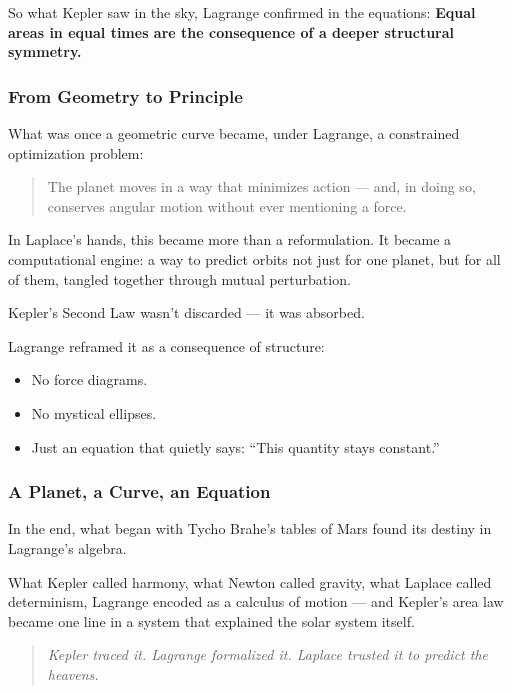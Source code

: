 So what Kepler saw in the sky, Lagrange confirmed in the equations:  
\textbf{Equal areas in equal times are the consequence of a deeper structural symmetry.}

\subsubsection*{From Geometry to Principle}

What was once a geometric curve became, under Lagrange, a constrained optimization problem:
\begin{quote}
    The planet moves in a way that minimizes action —  
    and, in doing so, conserves angular motion without ever mentioning a force.
\end{quote}

In Laplace’s hands, this became more than a reformulation. It became a computational engine:  
a way to predict orbits not just for one planet, but for all of them, tangled together through mutual perturbation.

\begin{tcolorbox}[colback=blue!5!white, colframe=blue!60!black, title={Kepler, Rediscovered}]
Kepler’s Second Law wasn’t discarded — it was absorbed.

Lagrange reframed it as a consequence of structure:  
\begin{itemize}
    \item No force diagrams.
    \item No mystical ellipses.
    \item Just an equation that quietly says: “This quantity stays constant.”
\end{itemize}
\end{tcolorbox}

\subsubsection*{A Planet, a Curve, an Equation}

In the end, what began with Tycho Brahe’s tables of Mars found its destiny in Lagrange’s algebra.

What Kepler called harmony,  
what Newton called gravity,  
what Laplace called determinism,  
Lagrange encoded as a calculus of motion — and Kepler’s area law became one line in a system that explained the solar system itself.

\begin{quote}
    \textit{Kepler traced it.  
    Lagrange formalized it.  
    Laplace trusted it to predict the heavens.}
\end{quote}

